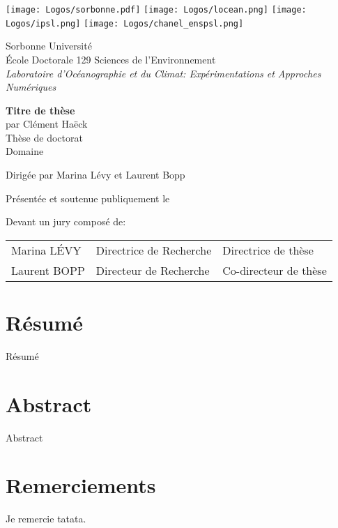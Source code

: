 \documentclass[french, a4paper, twoside, 11pt, draft]{book}
\newcommand\Title{Titre de thèse}
\begin{document}

\begin{center}
  \texttt{[image: Logos/sorbonne.pdf]}
  \hfill
  \texttt{[image: Logos/locean.png]}
  \hfill
  \texttt{[image: Logos/ipsl.png]}
  \hfill
  \texttt{[image: Logos/chanel\_enspsl.png]}

  \vspace{4em}
  {\LARGE Sorbonne Université}\\[2ex]
  École Doctorale 129 Sciences de l'Environnement\\
  \emph{Laboratoire d'Océanographie et du Climat: Expérimentations et Approches Numériques}

  \vspace{4em}

  \textbf{{\LARGE \Title}}\\[2ex]
  par Clément Haëck\\[2ex]
  Thèse de doctorat\\
  Domaine

  \vspace{4em}

  Dirigée par Marina Lévy et Laurent Bopp

  \vspace{4em}

  Présentée et soutenue publiquement le\\
\end{center}
Devant un jury composé de:\\[1ex]
\begin{tabular}{p{}p{}p{}<{\raggedleft}}
  Marina LÉVY & Directrice de Recherche & Directrice de thèse \\
  Laurent BOPP & Directeur de Recherche & Co-directeur de thèse \\
\end{tabular}

\restoregeometry
\newpage

\section*{Résumé}
Résumé

\section*{Abstract}
Abstract

\newpage
\section*{Remerciements}
Je remercie tatata.

\newpage
\tableofcontents
\newpage










\printbibliography{}
\end{document}
